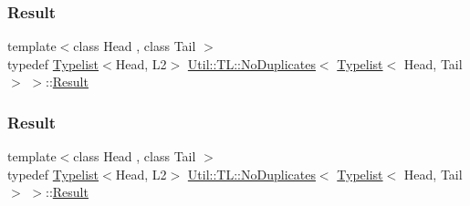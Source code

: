 \subsubsection{\texorpdfstring{Result}{Result}\hspace{0.1cm}{\footnotesize\ttfamily [1/3]}}
{\footnotesize\ttfamily template$<$class Head , class Tail $>$ \\
typedef \mbox{\hyperlink{structUtil_1_1Typelist}{Typelist}}$<$Head, L2$>$ \mbox{\hyperlink{structUtil_1_1TL_1_1NoDuplicates}{Util\+::\+T\+L\+::\+No\+Duplicates}}$<$ \mbox{\hyperlink{structUtil_1_1Typelist}{Typelist}}$<$ Head, Tail $>$ $>$\+::\mbox{\hyperlink{structUtil_1_1TL_1_1NoDuplicates_3_01Typelist_3_01Head_00_01Tail_01_4_01_4_ada564784f87c4684be2e13c5e1bf722e}{Result}}}

\mbox{\label{structUtil_1_1TL_1_1NoDuplicates_3_01Typelist_3_01Head_00_01Tail_01_4_01_4_ada564784f87c4684be2e13c5e1bf722e}} 
\subsubsection{\texorpdfstring{Result}{Result}\hspace{0.1cm}{\footnotesize\ttfamily [2/3]}}
{\footnotesize\ttfamily template$<$class Head , class Tail $>$ \\
typedef \mbox{\hyperlink{structUtil_1_1Typelist}{Typelist}}$<$Head, L2$>$ \mbox{\hyperlink{structUtil_1_1TL_1_1NoDuplicates}{Util\+::\+T\+L\+::\+No\+Duplicates}}$<$ \mbox{\hyperlink{structUtil_1_1Typelist}{Typelist}}$<$ Head, Tail $>$ $>$\+::\mbox{\hyperlink{structUtil_1_1TL_1_1NoDuplicates_3_01Typelist_3_01Head_00_01Tail_01_4_01_4_ada564784f87c4684be2e13c5e1bf722e}{Result}}}

\mbox{\label{structUtil_1_1TL_1_1NoDuplicates_3_01Typelist_3_01Head_00_01Tail_01_4_01_4_ada564784f87c4684be2e13c5e1bf722e}} 
